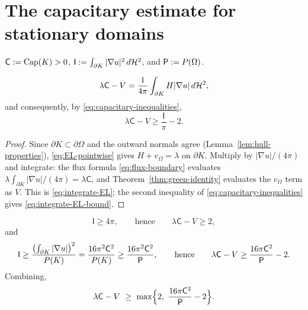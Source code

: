 \chapter{The capacitary estimate for stationary domains}\label{ch:cap-estimate}

\begin{notation}\label{not:cap-estimate}
$\mathsf C:=\operatorname{Cap}(K)>0$,
$\mathsf I:=\int_{\partial K}|\nabla u|^2\,d\mathcal H^2$, and
$\mathsf P:=P(\Omega)$.
\end{notation}

\begin{lemma}\label{lem:integrate-EL}
\begin{equation}\label{eq:integrate-EL}
  \lambda\mathsf C-V=\frac1{4\pi}\int_{\partial K}H|\nabla u|\,d\mathcal H^2 ,
\end{equation}
and consequently, by \eqref{eq:capacitary-inequalities},
\begin{equation}\label{eq:integrate-EL-bound}
  \lambda\mathsf C-V\ge\frac{\mathsf I}{\pi}-2 .
\end{equation}
\end{lemma}

\begin{proof}
Since $\partial K\subset\partial\Omega$ and the outward normals agree
(Lemma~\ref{lem:hull-properties}), \eqref{eq:EL-pointwise} gives
$H+v_\Omega=\lambda$ on $\partial K$.  Multiply by $|\nabla u|/(4\pi)$ and
integrate: the flux formula \eqref{eq:flux-boundary} evaluates
$\lambda\int_{\partial K}|\nabla u|/(4\pi)=\lambda\mathsf C$, and
Theorem~\ref{thm:green-identity} evaluates the $v_\Omega$ term as $V$.  This is
\eqref{eq:integrate-EL}; the second inequality of
\eqref{eq:capacitary-inequalities} gives \eqref{eq:integrate-EL-bound}.
\end{proof}

\begin{lemma}\label{lem:two-bounds-I}
\begin{equation}\label{eq:I-bound-1}
  \mathsf I\ge4\pi,
  \qquad\text{hence}\qquad
  \lambda\mathsf C-V\ge2 ,
\end{equation}
and
\begin{equation}\label{eq:I-bound-2}
  \mathsf I\ge\frac{\bigl(\int_{\partial K}|\nabla u|\bigr)^2}{P(K)}
  =\frac{16\pi^2\mathsf C^2}{P(K)}
  \ge\frac{16\pi^2\mathsf C^2}{\mathsf P},
  \qquad\text{hence}\qquad
  \lambda\mathsf C-V\ge\frac{16\pi\mathsf C^2}{\mathsf P}-2 .
\end{equation}
Combining,
\begin{equation}\label{eq:I-bound-combined}
  \lambda\mathsf C-V\ \ge\ \max\Bigl\{2,\ \frac{16\pi\mathsf C^2}{\mathsf P}-2\Bigr\}.
\end{equation}
\end{lemma}

